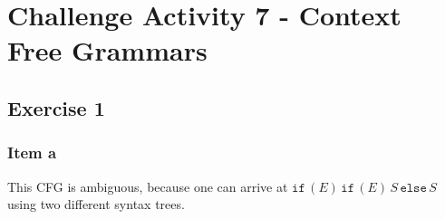 \documentclass[docid=CA07]{tcom_CA}
\begin{document}
\setcounter{section}{6}
\section{Challenge Activity 7 - Context Free Grammars}
\subsection{Exercise 1}%
{
\renewcommand{\thesubsubsection}{\thesubsection\alph{subsubsection}}
\subsubsection{Item a}
This CFG is ambiguous, because one can arrive at $\mathtt{if}\,(E)\,\mathtt{if}\,(E)\,S\,\mathtt{else}\,S$ using two different syntax trees.
\begin{center}
\begin{minipage}{0.45\textwidth}
	\begin{center}
	\end{center}
\end{minipage}%
\begin{minipage}{0.40\textwidth}
	\begin{center}
	\end{center}
\end{minipage}
\end{center}
}
\end{document}
